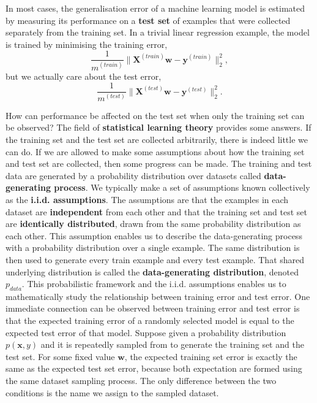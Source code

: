 In most cases, the generalisation error of a machine learning model is
estimated by measuring its performance on a \textbf{test set} of examples
that were collected separately from the training set. In a trivial linear
regression example, the model is trained by minimising the training error,
\begin{equation*}
    \frac{1}{m^{(train)}}{\lVert\boldsymbol{X}^{(train)}\boldsymbol{w} -
    \boldsymbol{y}^{(train)}}\rVert_2^2,
\end{equation*}
but we actually care about the test error,
\begin{equation*}
    \frac{1}{m^{(test)}}{\lVert\boldsymbol{X}^{(test)}\boldsymbol{w} -
    \boldsymbol{y}^{(test)}}\rVert_2^2.
\end{equation*}

How can performance be affected on the test set when only the training set can
be observed? The field of \textbf{statistical learning theory} provides some
answers. If the training set and the test set are collected arbitrarily, there
is indeed little we can do. If we are allowed to make some assumptions about
how the training set and test set are collected, then some progress can be
made. The training and test data are generated by a probability distribution
over datasets called \textbf{data-generating process}. We typically make a set
of assumptions known collectively as the \textbf{i.i.d. assumptions}. The
assumptions are that the examples in each dataset are \textbf{independent} from
each other and that the training set and test set are \textbf{identically
distributed}, drawn from the same probability distribution as each other. This
assumption enables us to describe the data-generating process with a
probability distribution over a single example. The same distribution is then
used to generate every train example and every test example. That shared
underlying distribution is called the \textbf{data-generating distribution},
denoted $p_{data}$. This probabilistic framework and the i.i.d. assumptions
enables us to mathematically study the relationship between training error and
test error. One immediate connection can be observed between training error and
test error is that the expected training error of a randomly selected model is
equal to the expected test error of that model. Suppose given a probability
distribution $p(\boldsymbol{x}, y)$ and it is repeatedly sampled from to
generate the training set and the test set. For some fixed value
$\boldsymbol{w}$, the expected training set error is exactly the same as the
expected test set error, because both expectation are formed using the same
dataset sampling process. The only difference between the two conditions is the
name we assign to the sampled dataset.


